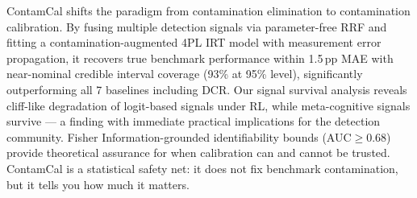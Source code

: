 \documentclass[letterpaper]{article}
\begin{document}
ContamCal shifts the paradigm from contamination elimination to contamination calibration.
By fusing multiple detection signals via parameter-free RRF and fitting a contamination-augmented 4PL IRT model with measurement error propagation, it recovers true benchmark performance within 1.5\,pp MAE with near-nominal credible interval coverage (93\% at 95\% level), significantly outperforming all 7 baselines including DCR.
Our signal survival analysis reveals cliff-like degradation of logit-based signals under RL, while meta-cognitive signals survive --- a finding with immediate practical implications for the detection community.
Fisher Information-grounded identifiability bounds (AUC$\geq$0.68) provide theoretical assurance for when calibration can and cannot be trusted.
ContamCal is a statistical safety net: it does not fix benchmark contamination, but it tells you how much it matters.
\end{document}
